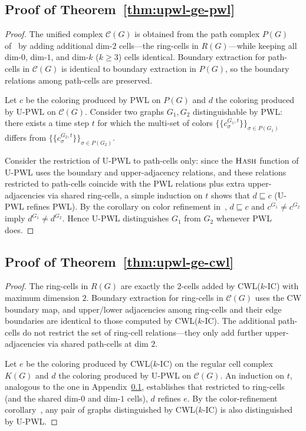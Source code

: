 \documentclass{article}
\begin{document}
\subsection{Proof of Theorem~\ref{thm:upwl-ge-pwl}}
\label{app:proof-upwl-pwl}
\begin{proof}
  The unified complex $\mathcal{C}(G)$ is obtained from the path complex $P(G)$ of~\citet{truong_weisfeiler_2024} by adding additional dim-$2$ cells---the ring-cells in $R(G)$---while keeping all dim-$0$, dim-$1$, and dim-$k$ ($k \geq 3$) cells identical. Boundary extraction for path-cells in $\mathcal{C}(G)$ is identical to boundary extraction in $P(G)$, so the boundary relations among path-cells are preserved.

  Let $c$ be the coloring produced by PWL on $P(G)$ and $d$ the coloring produced by U-PWL on $\mathcal{C}(G)$. Consider two graphs $G_1, G_2$ distinguishable by PWL: there exists a time step $t$ for which the multi-set of colors $\{\!\!\{ c_\sigma^{G_1, t} \}\!\!\}_{\sigma \in P(G_1)}$ differs from $\{\!\!\{ c_\sigma^{G_2, t} \}\!\!\}_{\sigma \in P(G_2)}$.

  Consider the restriction of U-PWL to path-cells only: since the $\textsc{Hash}$ function of U-PWL uses the boundary and upper-adjacency relations, and these relations restricted to path-cells coincide with the PWL relations plus extra upper-adjacencies via shared ring-cells, a simple induction on $t$ shows that $d \sqsubseteq c$ (U-PWL refines PWL). By the corollary on color refinement in~\citet{truong_weisfeiler_2024}, $d \sqsubseteq c$ and $c^{G_1} \neq c^{G_2}$ imply $d^{G_1} \neq d^{G_2}$. Hence U-PWL distinguishes $G_1$ from $G_2$ whenever PWL does.
\end{proof}

\subsection{Proof of Theorem~\ref{thm:upwl-ge-cwl}}
\label{app:proof-upwl-cwl}
\begin{proof}
  The ring-cells in $R(G)$ are exactly the $2$-cells added by CWL($k$-IC) with maximum dimension $2$. Boundary extraction for ring-cells in $\mathcal{C}(G)$ uses the CW boundary map, and upper/lower adjacencies among ring-cells and their edge boundaries are identical to those computed by CWL($k$-IC). The additional path-cells do not restrict the set of ring-cell relations---they only add further upper-adjacencies via shared path-cells at dim $2$.

  Let $e$ be the coloring produced by CWL($k$-IC) on the regular cell complex $K(G)$ and $d$ the coloring produced by U-PWL on $\mathcal{C}(G)$. An induction on $t$, analogous to the one in Appendix~\ref{app:proof-upwl-pwl}, establishes that restricted to ring-cells (and the shared dim-$0$ and dim-$1$ cells), $d$ refines $e$. By the color-refinement corollary~\citep{bodnar_weisfeiler_2022}, any pair of graphs distinguished by CWL($k$-IC) is also distinguished by U-PWL.
\end{proof}
\end{document}
